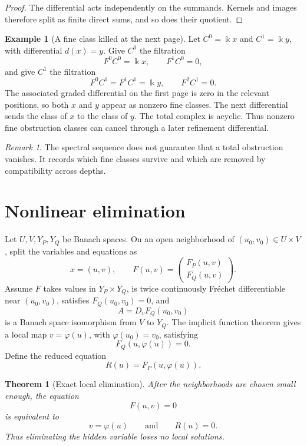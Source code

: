 \documentclass[11pt,a4paper]{article}
\newtheorem{theorem}{Theorem}[section]
\theoremstyle{plain}
\theoremstyle{definition}
\newtheorem{example}[example]{Example}
\theoremstyle{remark}
\newtheorem{remark}[remark]{Remark}
\newcommand{\bbk}{\Bbbk}
\begin{document}
\begin{proof}
The differential acts independently on the summands.  Kernels and images therefore split as finite direct sums, and so does their quotient.
\end{proof}

\begin{example}[A fine class killed at the next page]\label{ex:spectral_cancellation}
Let $C^0=\bbk x$ and $C^1=\bbk y$, with differential $d(x)=y$.  Give $C^0$ the filtration
\[
F^0C^0=\bbk x,
\qquad
F^1C^0=0,
\]
and give $C^1$ the filtration
\[
F^0C^1=F^1C^1=\bbk y,
\qquad
F^2C^1=0.
\]
The associated graded differential on the first page is zero in the relevant positions, so both $x$ and $y$ appear as nonzero fine classes.  The next differential sends the class of $x$ to the class of $y$.  The total complex is acyclic.  Thus nonzero fine obstruction classes can cancel through a later refinement differential.
\end{example}

\begin{remark}\label{rem:spectral_sequence_meaning}
The spectral sequence does not guarantee that a total obstruction vanishes.  It records which fine classes survive and which are removed by compatibility across depths.
\end{remark}

\section{Nonlinear elimination}\label{sec:nonlinear_elimination}

Let $U,V,Y_P,Y_Q$ be Banach spaces. On an open neighborhood of $(u_0,v_0)\in U\times V$, split the variables and equations as
\[
x=(u,v),
\qquad
F(u,v)=
\begin{pmatrix}
F_P(u,v)\\
F_Q(u,v)
\end{pmatrix}.
\]
Assume $F$ takes values in $Y_P\times Y_Q$, is twice continuously Fr\'echet differentiable near $(u_0,v_0)$, satisfies $F_Q(u_0,v_0)=0$, and
\[
A=D_vF_Q(u_0,v_0)
\]
is a Banach space isomorphism from $V$ to $Y_Q$. The implicit function theorem gives a local map $v=\varphi(u)$, with $\varphi(u_0)=v_0$, satisfying
\[
F_Q(u,\varphi(u))=0.
\]
Define the reduced equation
\[
R(u)=F_P(u,\varphi(u)).
\]

\begin{theorem}[Exact local elimination]\label{thm:exact_local_elimination}
After the neighborhoods are chosen small enough, the equation
\[
F(u,v)=0
\]
is equivalent to
\[
v=\varphi(u)
\qquad\text{and}\qquad
R(u)=0.
\]
Thus eliminating the hidden variable loses no local solutions.
\end{theorem}
\end{document}
